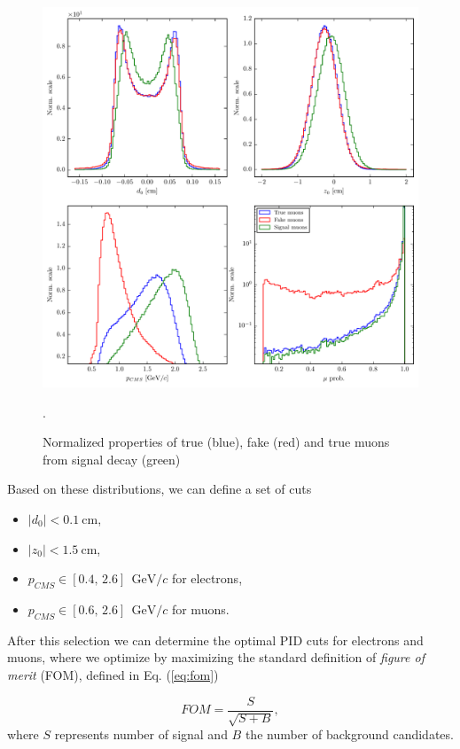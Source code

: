 \documentclass[oneside,a4paper,openany,12pt]{scrbook}
\newcommand {\e}[1]{\mathrm{~#1}}
\begin{document}
\begin{figure}[H]
\centering
\includegraphics[width=\linewidth]{fig/FSP_mu_vars}
\captionsetup{width=.8\linewidth}
\caption{Normalized properties of true (blue), fake (red) and true muons from signal decay (green)}.
\label{fig:muvars}
\end{figure}

Based on these distributions, we can define a set of cuts
\begin{itemize}
\item $\vert d_0 \vert < 0.1\e{cm}$,
\item $\vert z_0 \vert < 1.5\e{cm}$,
\item $p_{CMS} \in [0.4,\,2.6]~\e{GeV}/c$ for electrons,
\item $p_{CMS} \in [0.6,\,2.6]~\e{GeV}/c$ for muons.
\end{itemize}

After this selection we can determine the optimal PID cuts for electrons and muons, where we optimize by maximizing the standard definition of \textit{figure of merit} (FOM), defined in Eq. (\ref{eq:fom})

\begin{equation}
\label{eq:fom}
FOM = \frac{S}{\sqrt{S+B}},
\end{equation} 
where $S$ represents number of signal and $B$ the number of background candidates.
\end{document}
